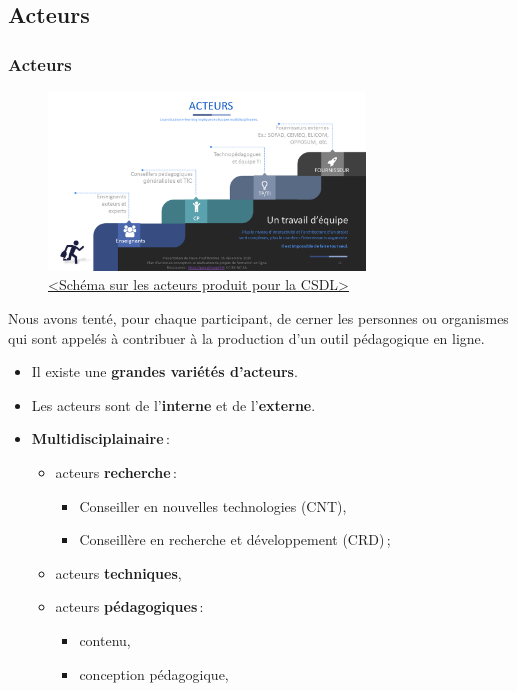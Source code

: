 		 \subsection{Acteurs} 
					\begin{frame}[allowframebreaks]
						\frametitle{Acteurs}
                        			\begin{figure}
                     			\centering
                    			 \includegraphics[width = 0.75\textwidth]{acteurs.png}
                     			\caption{\tiny{\href{run:acteurs.png}{<Schéma sur les acteurs produit pour la CSDL>}}}
                   			\end{figure}
                        			Nous avons tenté, pour chaque participant, de cerner les personnes ou organismes qui sont appelés à contribuer à la production d’un outil pédagogique en ligne.
							\begin{itemize}
							\item Il existe une \textbf{grandes variétés d'acteurs}.
							\item Les acteurs sont de l'\textbf{interne} et de l'\textbf{externe}.
							\item \textbf{Multidisciplainaire}\,:
								\begin{itemize}
								\item acteurs \textbf{recherche}\,: 
									\begin{itemize}
									\item Conseiller en nouvelles technologies (CNT),
									\item Conseillère en recherche et développement (CRD)\,;
									\end{itemize}
								\item acteurs\textbf{ techniques},												
								\framebreak
								\item acteurs \textbf{pédagogiques}\,:
									\begin{itemize}
									\item contenu,
									\item conception pédagogique,

\end{itemize}
\end{itemize}
\end{itemize}
\end{frame}
